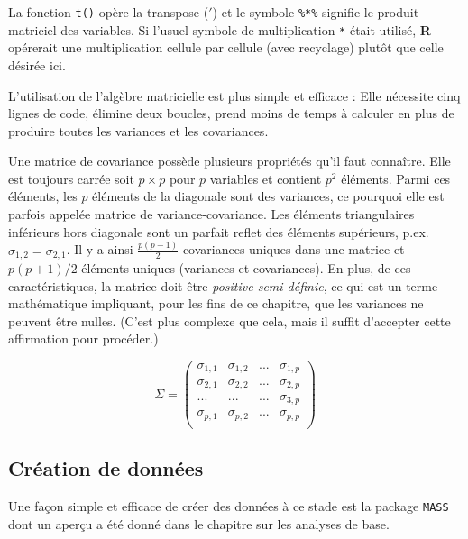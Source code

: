 \documentclass[
]{book}
\begin{document}
La fonction \texttt{t()} opère la transpose (\(\prime\)) et le symbole \texttt{\%*\%} signifie le produit matriciel des variables. Si l'usuel symbole de multiplication \texttt{*} était utilisé, \textbf{R} opérerait une multiplication cellule par cellule (avec recyclage) plutôt que celle désirée ici.

L'utilisation de l'algèbre matricielle est plus simple et efficace : Elle nécessite cinq lignes de code, élimine deux boucles, prend moins de temps à calculer en plus de produire toutes les variances et les covariances.

Une matrice de covariance possède plusieurs propriétés qu'il faut connaître. Elle est toujours carrée soit \(p \times p\) pour \(p\) variables et contient \(p^2\) éléments. Parmi ces éléments, les \(p\) éléments de la diagonale sont des variances, ce pourquoi elle est parfois appelée matrice de variance-covariance. Les éléments triangulaires inférieurs hors diagonale sont un parfait reflet des éléments supérieurs, p.ex. \(\sigma_{1,2} = \sigma_{2,1}\). Il y a ainsi \(\frac{p(p-1)}{2}\) covariances uniques dans une matrice et \(p(p+1)/2\) éléments uniques (variances et covariances). En plus, de ces caractéristiques, la matrice doit être \emph{positive semi-définie}, ce qui est un terme mathématique impliquant, pour les fins de ce chapitre, que les variances ne peuvent être nulles. (C'est plus complexe que cela, mais il suffit d'accepter cette affirmation pour procéder.)

\[
\Sigma = \left( 
\begin{array}{cccc}
\sigma_{1,1} & \sigma_{1,2} & ... &  \sigma_{1,p}\\
\sigma_{2,1} & \sigma_{2,2} & ... &  \sigma_{2,p}\\
...& ...& ... &  \sigma_{3,p}\\
\sigma_{p,1} & \sigma_{p,2} & ... &  \sigma_{p,p}\\
\end{array}
\right)
\]

\hypertarget{cruxe9ation-de-donnuxe9es}{%
\subsection{Création de données}\label{cruxe9ation-de-donnuxe9es}}

Une façon simple et efficace de créer des données à ce stade est la package \texttt{MASS} dont un aperçu a été donné dans le chapitre sur les analyses de base.
\end{document}
